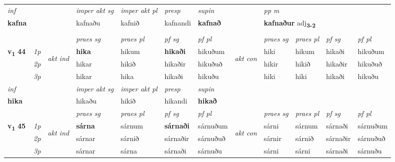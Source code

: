 \begin{longtable}[l]{X>{\footnotesize\itshape}llXXXXlXXXX}
   {\textit{inf}} & &  & \textit{imper akt sg} & \textit{imper akt pl}   & \textit{presp} & \textit{supin}  && \textit{pp m} \\*
  {\textbf{kafna}} & && kafnaðu  & kafnið   & kafnandi &  \textbf{kafnað}  && \multicolumn{2}{l}{\textbf{kafnaður} adj\textbf{\textsubscript{3-2}}} \\*

\midrule


& \\
\midrule

 & &   & \textit{praes sg}  & \textit{praes pl}    & \textit{ pf sg} & \textit{pf pl} & & \textit{praes sg}  & \textit{praes pl}    & \textit{pf sg} & \textit{pf pl }  \\ \cmidrule{4-7} \cmidrule{9-12}
 \multirow{2}{*}{{{\textbf{v{\textsubscript{1}}} \Large{\textbf{44}}}}}  & 1p & \multirow{3}{*}{\begin{turn}{90}\textit{akt ind}\end{turn}} & \textbf{hika} & hikum & \textbf{hikaði} & hikuðum & \multirow{3}{*}{\begin{turn}{90}\textit{akt con}\end{turn}} &hiki & hikum & hikaði & hikuðum\\*
 & 2p &  &  hikar  & hikið & hikaðir & hikuðuð & & hikir & hikið & hikaðir & hikuðuð \\*
 & 3p &  & hikar & hika & hikaði & hikuðu & & hiki & hiki& hikaði & hikuðu \\*
\cmidrule{4-7} \cmidrule{9-12}

   {\textit{inf}} & &  & \textit{imper akt sg} & \textit{imper akt pl}   & \textit{presp} & \textit{supin}   \\*
  {\textbf{hika}} & && hikaðu  & hikið   & hikandi &  \textbf{hikað}   \\*

\midrule

 & &   & \textit{praes sg}  & \textit{praes pl}    & \textit{ pf sg} & \textit{pf pl} & & \textit{praes sg}  & \textit{praes pl}    & \textit{pf sg} & \textit{pf pl }  \\ \cmidrule{4-7} \cmidrule{9-12}
 \multirow{2}{*}{{{\textbf{v{\textsubscript{1}}} \Large{\textbf{45}}}}}  & 1p & \multirow{3}{*}{\begin{turn}{90}\textit{akt ind}\end{turn}} & \textbf{sárna} & sárnum & \textbf{sárnaði} & sárnuðum & \multirow{3}{*}{\begin{turn}{90}\textit{akt con}\end{turn}} &sárni & sárnum & sárnaði & sárnuðum\\*
 & 2p &  &  sárnar  & sárnið & sárnaðir & sárnuðuð & & sárnir & sárnið & sárnaðir & sárnuðuð \\*
 & 3p &  & sárnar & sárna & sárnaði & sárnuðu & & sárni & sárni& sárnaði & sárnuðu \\*
\cmidrule{4-7} \cmidrule{9-12}


\end{longtable}
